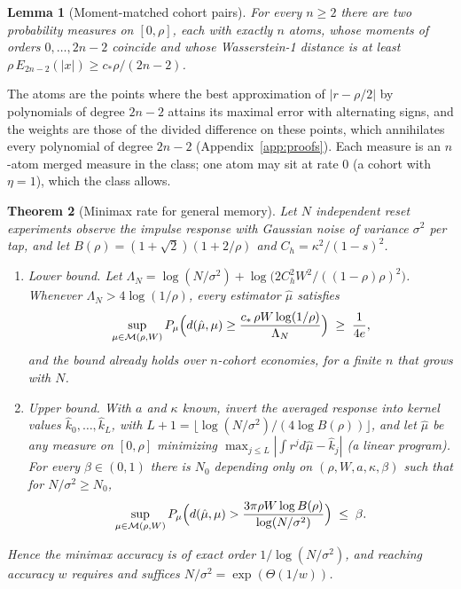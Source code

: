 \documentclass[12pt]{article}
\newtheorem{theorem}{Theorem}[section]
\newtheorem{lemma}[theorem]{Lemma}
\theoremstyle{definition}
\theoremstyle{remark}
\begin{document}
\begin{lemma}[Moment-matched cohort pairs]\label{lem:altpair}
For every $n\ge2$ there are two probability measures on $[0,\rho]$, each with exactly $n$ atoms, whose moments of orders $0,\ldots,2n-2$ coincide and whose Wasserstein-1 distance is at least $\rho\,E_{2n-2}(|x|)\ge c_*\rho/(2n-2)$.
\end{lemma}

The atoms are the points where the best approximation of $|r-\rho/2|$ by polynomials of degree $2n-2$ attains its maximal error with alternating signs, and the weights are those of the divided difference on these points, which annihilates every polynomial of degree $2n-2$ (Appendix~\ref{app:proofs}). Each measure is an $n$-atom merged measure in the class; one atom may sit at rate $0$ (a cohort with $\eta=1$), which the class allows.

\begin{theorem}[Minimax rate for general memory]\label{thm:general}
Let $N$ independent reset experiments observe the impulse response with Gaussian noise of variance $\sigma^2$ per tap, and let $B(\rho)=(1+\sqrt2)(1+2/\rho)$ and $C_h=\kappa^2/(1-s)^2$.
\begin{enumerate}[label=(\roman*)]
\item \emph{Lower bound.} Let $\Lambda_N=\log(N/\sigma^2)+\log\bigl(2C_h^2W^2/((1-\rho)\rho)^2\bigr)$. Whenever $\Lambda_N>4\log(1/\rho)$, every estimator $\hat\mu$ satisfies
\[
\sup_{\mu\in\mathcal M(\rho,W)}P_\mu\Bigl(d(\hat\mu,\mu)\ge\frac{c_*\,\rho W\log(1/\rho)}{\Lambda_N}\Bigr)\;\ge\;\frac1{4e},
\]
and the bound already holds over $n$-cohort economies, for a finite $n$ that grows with $N$.
\item \emph{Upper bound.} With $a$ and $\kappa$ known, invert the averaged response into kernel values $\hat k_0,\ldots,\hat k_L$, with $L+1=\lfloor\log(N/\sigma^2)/(4\log B(\rho))\rfloor$, and let $\hat\mu$ be any measure on $[0,\rho]$ minimizing $\max_{j\le L}|\int r^jd\hat\mu-\hat k_j|$ (a linear program). For every $\beta\in(0,1)$ there is $N_0$ depending only on $(\rho,W,a,\kappa,\beta)$ such that for $N/\sigma^2\ge N_0$,
\[
\sup_{\mu\in\mathcal M(\rho,W)}P_\mu\Bigl(d(\hat\mu,\mu)>\frac{3\pi\rho W\log B(\rho)}{\log(N/\sigma^2)}\Bigr)\;\le\;\beta .
\]
\end{enumerate}
Hence the minimax accuracy is of exact order $1/\log(N/\sigma^2)$, and reaching accuracy $w$ requires and suffices $N/\sigma^2=\exp(\Theta(1/w))$.
\end{theorem}
\end{document}
